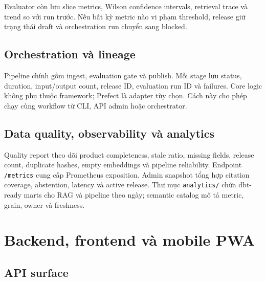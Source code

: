 \documentclass[12pt,a4paper]{report}
\newcommand{\code}[1]{\texttt{#1}}
\begin{document}
Evaluator còn lưu slice metrics, Wilson confidence intervals, retrieval trace
và trend so với run trước. Nếu bất kỳ metric nào vi phạm threshold, release giữ
trạng thái draft và orchestration run chuyển sang blocked.

\section{Orchestration và lineage}

Pipeline chính gồm ingest, evaluation gate và publish. Mỗi stage lưu status,
duration, input/output count, release ID, evaluation run ID và failures. Core
logic không phụ thuộc framework; Prefect là adapter tùy chọn. Cách này cho phép
chạy cùng workflow từ CLI, API admin hoặc orchestrator.

\section{Data quality, observability và analytics}

Quality report theo dõi product completeness, stale ratio, missing fields,
release count, duplicate hashes, empty embeddings và pipeline reliability.
Endpoint \code{/metrics} cung cấp Prometheus exposition. Admin snapshot tổng
hợp citation coverage, abstention, latency và active release. Thư mục
\code{analytics/} chứa dbt-ready marts cho RAG và pipeline theo ngày; semantic
catalog mô tả metric, grain, owner và freshness.

\chapter{Backend, frontend và mobile PWA}

\section{API surface}
\end{document}
